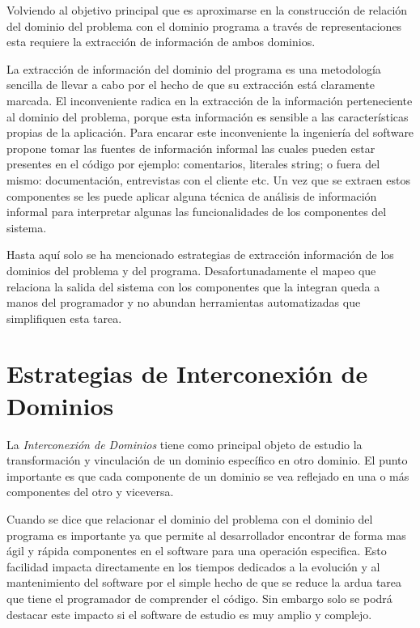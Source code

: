 \documentclass[a4paper,12pt]{report}
\begin{document}
Volviendo al objetivo principal que es aproximarse en la construcción de relación del dominio del problema con el dominio programa a través de representaciones esta requiere la extracción de información de ambos dominios.

La extracción de información del dominio del programa es una metodología sencilla de llevar a cabo por el hecho de que su extracción está claramente marcada. El inconveniente radica en la extracción de la información perteneciente al dominio del problema, porque esta información es sensible a las características propias de la aplicación. Para encarar este inconveniente la ingeniería del software propone tomar las fuentes de información informal las cuales pueden estar presentes en el código por ejemplo: comentarios, literales string; o fuera del mismo: documentación, entrevistas con el cliente etc. Un vez que se extraen estos componentes se les puede aplicar alguna técnica de análisis de información informal para interpretar algunas las funcionalidades de los componentes del sistema.

Hasta aquí solo se ha mencionado estrategias de extracción información de los dominios del problema y del programa. Desafortunadamente el mapeo que relaciona la salida del sistema con los componentes que la integran queda a manos del programador y no abundan herramientas automatizadas que simplifiquen esta tarea.

\section{Estrategias de Interconexión de \\Dominios}

La \textit{Interconexión de Dominios} \cite{BRM10} tiene como principal objeto de estudio la transformación y vinculación de un dominio específico en otro dominio.
El punto importante es que cada componente de un dominio se vea reflejado en una o más componentes del otro y viceversa. 

Cuando se dice que relacionar el dominio del problema con el dominio del programa es importante ya que permite al desarrollador encontrar de forma mas ágil y rápida componentes en el software para una operación especifica. Esto facilidad impacta directamente en los tiempos dedicados a la evolución y al mantenimiento del software por el simple hecho de que se reduce la ardua tarea que tiene el programador de comprender el código.
Sin embargo solo se podrá destacar este impacto si el software de estudio es muy amplio y complejo.
\end{document}
